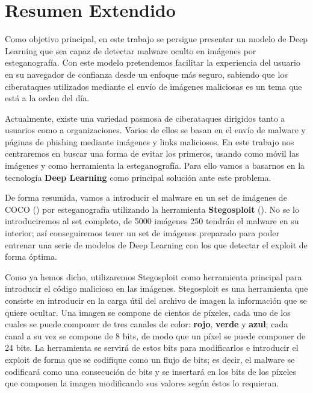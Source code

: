\chapter{Resumen Extendido}

Como objetivo principal, en este trabajo se persigue presentar un modelo de Deep Learning que sea capaz de detectar malware oculto en imágenes por esteganografía. Con este modelo pretendemos facilitar la experiencia del usuario en su navegador de confianza desde un enfoque más seguro, sabiendo que los ciberataques utilizados mediante el envío de imágenes maliciosas es un tema que está a la orden del día.

Actualmente, existe una variedad pasmosa de ciberataques dirigidos tanto a usuarios como a organizaciones. Varios de ellos se basan en el envío de malware y páginas de phishing mediante imágenes y links maliciosos. En este trabajo nos centraremos en buscar una forma de evitar los primeros, usando como móvil las imágenes y como herramienta la esteganografía. Para ello vamos a basarnos en la tecnología \textbf{Deep Learning} como principal solución ante este problema.

De forma resumida, vamos a introducir el malware en un set de imágenes de COCO (\cite{coco}) por esteganografía utilizando la herramienta \textbf{Stegosploit} (\cite{stegosploit}). No se lo introduciremos al set completo, de 5000 imágenes 250 tendrán el malware en su interior; así conseguiremos tener un set de imágenes preparado para poder entrenar una serie de modelos de Deep Learning con los que detectar el exploit de forma óptima. %

Como ya hemos dicho, utilizaremos Stegosploit como herramienta principal para introducir el código malicioso en las imágenes. Stegosploit es una herramienta que consiste en introducir en la carga útil del archivo de imagen la información que se quiere ocultar. Una imagen se compone de cientos de píxeles, cada uno de los cuales se puede componer de tres canales de color: \textbf{rojo}, \textbf{verde} y \textbf{azul}; cada canal a su vez se compone de 8 bits, de modo que un píxel se puede componer de 24 bits. La herramienta se servirá de estos bits para modificarlos e introducir el exploit de forma que se codifique como un flujo de bits; es decir, el malware se codificará como una consecución de bits y se insertará en los bits de los píxeles que componen la imagen modificando sus valores según éstos lo requieran.

